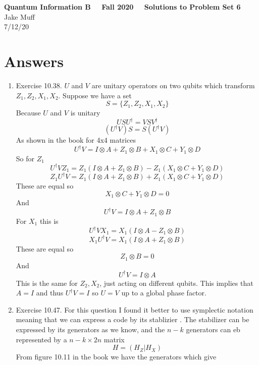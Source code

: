 \documentclass[12pt]{article}
\begin{document}
\normalsize

\baselineskip 14pt

\begin{center}
{\Large {\bf Quantum Information B \ \ Fall 2020 \ \  Solutions to Problem Set 6}} \\
Jake Muff \\
7/12/20
\end{center}

\bigskip
\section{Answers}

\begin{enumerate}
    \item Exercise 10.38. $U$ and $V$ are unitary operators on two qubits which transform $Z_1, Z_2, X_1, X_2$. Suppose we have a set 
    $$ S = \{ Z_1, Z_2, X_1, X_2 \} $$
    Because $U$ and $V$ is unitary 
    $$ US U^{\dagger} = VSV^{\dagger} $$
    $$ (U^{\dagger} V) S = S (U^{\dagger} V) $$
    As shown in the book for 4x4 matrices 
    $$ U^{\dagger} V = I \otimes A + Z_1 \otimes B + X_1 \otimes C + Y_1 \otimes D $$
    So for $Z_1$ 
    $$ U^{\dagger} V Z_1 = Z_1 ( I \otimes A + Z_1 \otimes B) - Z_1 (X_1 \otimes C + Y_1 \otimes D) $$
    $$ Z_1 U^{\dagger} V = Z_1 ( I \otimes A + Z_1 \otimes B ) + Z_1 ( X_1 \otimes C + Y_1 \otimes D) $$
    These are equal so 
    $$ X_1 \otimes C + Y_1 \otimes D = 0 $$
    And
    $$ U^{\dagger} V = I \otimes A + Z_1 \otimes B $$
    For $X_1$ this is 
    $$ U^{\dagger} V X_1 = X_1 ( I \otimes A - Z_1 \otimes B) $$
    $$ X_1 U^{\dagger} V = X_1 ( I \otimes A + Z_1 \otimes B) $$
    These are equal so 
    $$ Z_1 \otimes B = 0$$
    And 
    $$ U^{\dagger} V = I \otimes A $$
    This is the same for $Z_2, X_2$, just acting on different qubits. This implies that $A = I$ and thus $U^{\dagger} V = I$ so $U=V$ up to a global phase factor. 

    \item Exercise 10.47. For this question I found it better to use symplectic notation meaning that we can express a code by its stablizier . The stabilizer can be expressed by its generators as we know, and the $n-k$ generators can eb represented by a $n-k \times 2n$ matrix 
    $$ H = (H_Z | H_X ) $$
    From figure 10.11 in the book we have the generators which give 


\end{enumerate}
\end{document}
